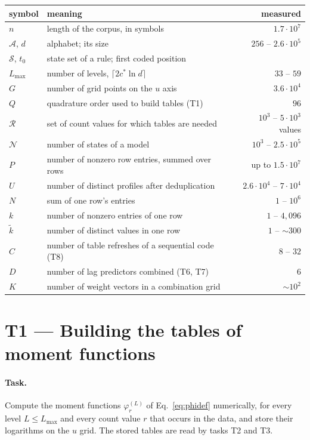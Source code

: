 \documentclass[11pt]{article}
\newcommand{\field}[1]{\paragraph{#1.}}
\begin{document}
\begin{center}
\small
\begin{tabular}{llr}
\toprule
symbol & meaning & measured \\
\midrule
$n$ & length of the corpus, in symbols & $1.7\cdot 10^7$ \\
$\mathcal{A}$, $d$ & alphabet; its size & $256$ -- $2.6\cdot 10^5$ \\
$\mathcal{S}$, $t_0$ & state set of a rule; first coded position & \\
$L_{\max}$ & number of levels, $\lceil 2c^{*}\ln d\rceil$ & $33$ -- $59$ \\
$G$ & number of grid points on the $u$ axis & $3.6\cdot 10^4$ \\
$Q$ & quadrature order used to build tables (T1) & $96$ \\
$\mathcal{R}$ & set of count values for which tables are needed & $10^3$ -- $5\cdot 10^3$ values \\
$\mathcal{N}$ & number of states of a model & $10^3$ -- $2.5\cdot 10^5$ \\
$P$ & number of nonzero row entries, summed over rows & up to $1.5\cdot 10^7$ \\
$U$ & number of distinct profiles after deduplication & $2.6\cdot 10^4$ -- $7\cdot 10^4$ \\
$N$ & sum of one row's entries & $1$ -- $10^6$ \\
$k$ & number of nonzero entries of one row & $1$ -- $4{,}096$ \\
$\tilde k$ & number of distinct values in one row & $1$ -- $\sim 300$ \\
$C$ & number of table refreshes of a sequential code (T8) & $8$ -- $32$ \\
$D$ & number of lag predictors combined (T6, T7) & $6$ \\
$K$ & number of weight vectors in a combination grid & $\sim 10^2$ \\
\bottomrule
\end{tabular}
\end{center}

\section{T1 --- Building the tables of moment functions}

\field{Task}
Compute the moment functions $\varphi^{(L)}_r$ of
Eq.~\eqref{eq:phidef} numerically, for every level
$L \le L_{\max}$ and every count value $r$ that occurs in the data,
and store their logarithms on the $u$ grid.  The stored tables are
read by tasks T2 and T3.
\end{document}
